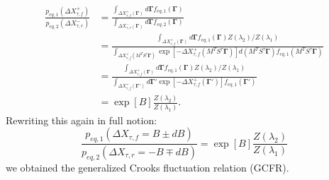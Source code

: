 \documentclass[a4paper,12pt]{article}
\begin{document}
\begin{equation}
\begin{aligned}
\frac{p_{eq,1}(\Delta X_{\tau,f}^+)}{p_{eq,2}(\Delta X_{\tau,r}^-)}
&=\frac{\int_{\Delta X_{\tau,f}^+(\bm{\Gamma})} d\bm{\Gamma} f_{eq,1}(\bm{\Gamma})}{\int_{\Delta X_{\tau,r}^-(\bm{\Gamma})} d\bm{\Gamma} f_{eq,2}(\bm{\Gamma})} \\
&= \frac{\int_{\Delta X_{\tau,f}^+(\bm{\Gamma})} d\bm{\Gamma} f_{eq,1}(\bm{\Gamma})Z(\lambda_2)/Z(\lambda_1)}{\int_{\Delta X_{\tau,f}^+(M^T S^{\tau}\bm{\Gamma})} \exp[-\Delta X_{\tau,f}^+(M^T S^{\tau}\bm{\Gamma})] d(M^T S^{\tau}\bm{\Gamma}) f_{eq,1}(M^T S^{\tau}\bm{\Gamma})} \\
&=\frac{\int_{\Delta X_{\tau,f}^+(\bm{\Gamma})} d\bm{\Gamma} f_{eq,1}(\bm{\Gamma}) Z(\lambda_2)/Z(\lambda_1)}{\int_{\Delta X_{\tau,f}^+(\bm{\Gamma}')} d\bm{\Gamma}' \exp[-\Delta X_{\tau,f}^+(\bm{\Gamma}')] f_{eq,1}(\bm{\Gamma}')} \\
&= \exp[B] \frac{Z(\lambda_2)}{Z(\lambda_1)}.
\end{aligned}
\end{equation}
Rewriting this again in full notion:
\begin{equation}
\label{GCFR}
\frac{p_{eq,1}(\Delta X_{\tau,f}=B\pm dB)}{p_{eq,2}(\Delta X_{\tau,r}=-B\mp dB)}= \exp[B] \frac{Z(\lambda_2)}{Z(\lambda_1)}
\end{equation}
we obtained the generalized Crooks fluctuation relation (GCFR).
\end{document}

